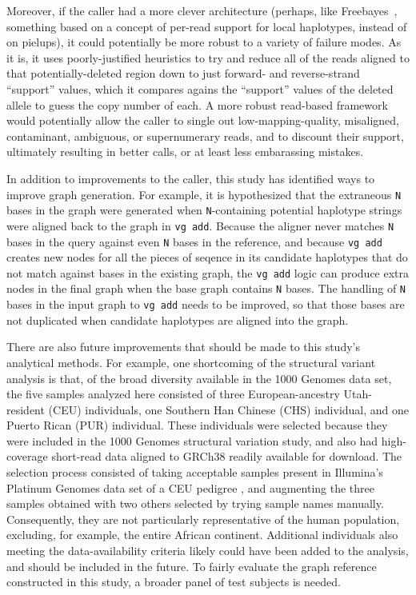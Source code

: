 Moreover, if the caller had a more clever architecture (perhaps, like Freebayes~\cite{garrison2012haplotype}, something based on a concept of per-read support for local haplotypes, instead of on pielups), it could potentially be more robust to a variety of failure modes. As it is, it uses poorly-justified heuristics to try and reduce all of the reads aligned to that potentially-deleted region down to just forward- and reverse-strand ``support'' values, which it compares agains the ``support'' values of the deleted allele to guess the copy number of each. A more robust read-based framework would potentially allow the caller to single out low-mapping-quality, misaligned, contaminant, ambiguous, or supernumerary reads, and to discount their support, ultimately resulting in better calls, or at least less embarassing mistakes.

In addition to improvements to the caller, this study has identified ways to improve graph generation. For example, it is hypothesized that the extraneous \texttt{N} bases in the graph were generated when \texttt{N}-containing potential haplotype strings were aligned back to the graph in \texttt{vg add}. Because the \vg aligner never matches \texttt{N} bases in the query against even \texttt{N} bases in the reference, and because \texttt{vg add} creates new nodes for all the pieces of seqence in its candidate haplotypes that do not match against bases in the existing graph, the \texttt{vg add} logic can produce extra nodes in the final graph when the base graph contains \texttt{N} bases. The handling of \texttt{N} bases in the input graph to \texttt{vg add} needs to be improved, so that those bases are not duplicated when candidate haplotypes are aligned into the graph. 

There are also future improvements that should be made to this study's analytical methods. For example, one shortcoming of the structural variant analysis is that, of the broad diversity available in the 1000 Genomes data set, the five samples analyzed here consisted of three European-ancestry Utah-resident (CEU) individuals, one Southern Han Chinese (CHS) individual, and one Puerto Rican (PUR) individual. These individuals were selected because they were included in the 1000 Genomes structural variation study, and also had high-coverage short-read data aligned to GRCh38 readily available for download. The selection process consisted of taking acceptable samples present in Illumina's Platinum Genomes data set of a CEU pedigree \cite{eberle2013platinum}, and augmenting the three samples obtained with two others selected by trying sample names manually. Consequently, they are not particularly representative of the human population, excluding, for example, the entire African continent. Additional individuals also meeting the data-availability criteria likely could have been added to the analysis, and should be included in the future. To fairly evaluate the graph reference constructed in this study, a broader panel of test subjects is needed.

